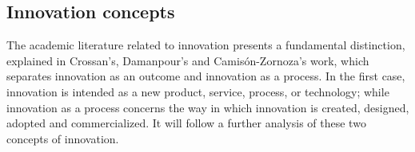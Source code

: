 \begin{table}[htbp]
\begin{tabular}{|p{5cm}|p{9cm}|}
    \bottomrule
    \end{tabular}%
  \label{tab:literaturereview}%
\end{table}%


\subsection{Innovation concepts}

The academic literature related to innovation presents a fundamental distinction, explained in Crossan's, Damanpour's and Camisón-Zornoza's work, which separates innovation as an outcome and innovation as a process.
In the first case, innovation is intended as a new product, service, process, or technology; while innovation as a process concerns the way in which innovation is created, designed, adopted and commercialized. It will follow a further analysis of these two concepts of innovation. \\

